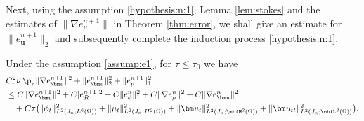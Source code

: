 Next, using the assumption \eqref{hypothesis:n:1}, Lemma \ref{lem:stokes} and the estimates of $\|\nabla e_\mu^{n+1}\|$ in Theorem \ref{thm:error}, we shall give an estimate for $\|e_{\bm u}^{n+1}\|_2$ and subsequently complete the induction process \eqref{hypothesis:n:1}.
\begin{lemma} \label{err:full:stokes:NS}
	Under the assumption \eqref{assump:e1},  for $\tau \le \tau_0$  we have
	\begin{equation*}  
		\begin{aligned}
			&   C_r^2\nu\,  \p_\tau \|\nabla e_{\bm u}^{n+1}\|^2   +  \|e_{\bm u}^{n+1}\|_2^2+\|e_p^{n+1}\|_1^2\\
			&\le  C \|\nabla e_{\bm u}^{n+1}\|^2+  C |e_R^{n+1}|^2+ C\|e_{\phi}^n\|_1^2   + C\|\nabla e_\mu^n\|^2 + C\|\nabla e_{\bm u}^{n}\|^2\\
			& \quad +   C\tau \big(\|\phi_t\|_{L^2(J_n ; L^6(\Omega))}^2 + \|\mu_t\|_{L^2(J_n ; H^2(\Omega))}^2+\|\bm u_t\|_{L^2(J_n ; \mbfH^2(\Omega))}^2
			                  +\|\bm u_{tt}\|_{L^2(J_n; \mbfL^2(\Omega))}^2\big).
		\end{aligned}
	\end{equation*}
\end{lemma}
